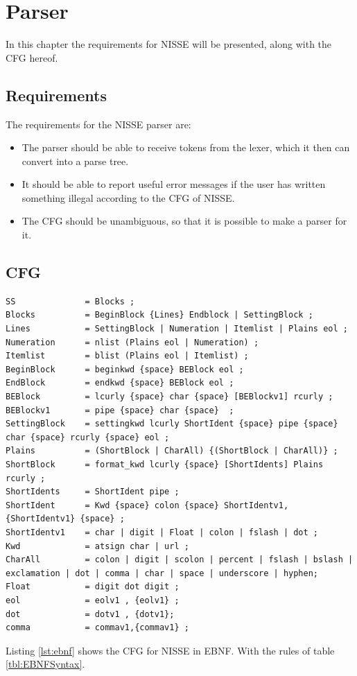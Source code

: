 \chapter{Parser}

In this chapter the requirements for NISSE will be presented, along with the CFG hereof.

\section{Requirements}
The requirements for the NISSE parser are:
\begin{itemize}
	\item The parser should be able to receive tokens from the lexer, which it then can convert into a parse tree.
	\item It should be able to report useful error messages if the user has written something illegal according to the CFG of NISSE.
	\item The CFG should be unambiguous, so that it is possible to make a parser for it. 
\end{itemize}

\newpage
\section{CFG}
\begin{lstlisting}[frame=single, caption={CFG of NISSE in EBNF.}, label={lst:ebnf}, language=NISSE]
SS              = Blocks ;
Blocks          = BeginBlock {Lines} Endblock | SettingBlock ;
Lines           = SettingBlock | Numeration | Itemlist | Plains eol ;
Numeration      = nlist (Plains eol | Numeration) ;
Itemlist        = blist (Plains eol | Itemlist) ;
BeginBlock      = beginkwd {space} BEBlock eol ;
EndBlock        = endkwd {space} BEBlock eol ;
BEBlock         = lcurly {space} char {space} [BEBlockv1] rcurly ;
BEBlockv1       = pipe {space} char {space}  ;
SettingBlock    = settingkwd lcurly ShortIdent {space} pipe {space} char {space} rcurly {space} eol ;
Plains          = (ShortBlock | CharAll) {(ShortBlock | CharAll)} ;
ShortBlock      = format_kwd lcurly {space} [ShortIdents] Plains rcurly ;
ShortIdents     = ShortIdent pipe ;
ShortIdent      = Kwd {space} colon {space} ShortIdentv1,{ShortIdentv1} {space} ;
ShortIdentv1    = char | digit | Float | colon | fslash | dot ;
Kwd             = atsign char | url ;
CharAll         = colon | digit | scolon | percent | fslash | bslash | exclamation | dot | comma | char | space | underscore | hyphen;
Float           = digit dot digit ; 
eol             = eolv1 , {eolv1} ;
dot             = dotv1 , {dotv1};
comma           = commav1,{commav1} ;
\end{lstlisting}
Listing \ref{lst:ebnf} shows the CFG for NISSE in EBNF. With the rules of table \ref{tbl:EBNFSyntax}.

